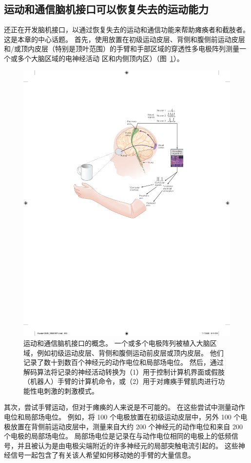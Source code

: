 \subsection{运动和通信脑机接口可以恢复失去的运动能力}

还正在开发脑机接口，以通过恢复失去的运动和通信功能来帮助瘫痪者和截肢者。
这是本章的中心话题。
首先，使用放置在初级运动皮层、背侧和腹侧前运动皮层和/或顶内皮层（特别是顶叶范围）的手臂和手部区域的穿透性多电极阵列测量一个或多个大脑区域的电神经活动 区和内侧顶内区）（图~\ref{fig:39_1}）。


\begin{figure}[htbp]
	\centering
	\includegraphics[width=0.85\linewidth]{chap39/fig_39_1}
	\caption{运动和通信脑机接口的概念。
		一个或多个电极阵列被植入大脑区域，例如初级运动皮层、背侧和腹侧运动前皮层或顶内皮层。
		他们记录了数十到数百个神经元的动作电位和局部场电位。
		然后，通过解码算法将记录的神经活动转换为（1）用于控制计算机界面或假肢（机器人）手臂的计算机命令，或（2）用于对瘫痪手臂肌肉进行功能性电刺激的刺激模式。}
	\label{fig:39_1}
\end{figure}


其次，尝试手臂运动，但对于瘫痪的人来说是不可能的。 
在这些尝试中测量动作电位和局部场电位。
例如，将 100 个电极放置在初级运动皮层中，另外 100 个电极放置在背侧前运动皮层中，测量来自大约 200 个神经元的动作电位和来自 200 个电极的局部场电位。
局部场电位是记录在与动作电位相同的电极上的低频信号，并且被认为是由电极尖端附近的许多神经元的局部突触电流引起的。
这些神经信号一起包含了有关该人希望如何移动她的手臂的大量信息。



